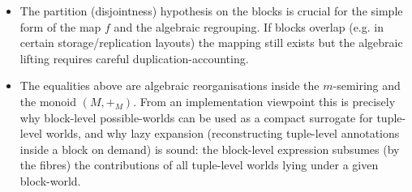 \begin{remark}

\begin{itemize}
  \item The partition (disjointness) hypothesis on the blocks is crucial for the simple form of the map $f$ and the algebraic regrouping. If blocks overlap (e.g. in certain storage/replication layouts) the mapping still exists but the algebraic lifting requires careful duplication-accounting.
  \item The equalities above are algebraic reorganisations inside the $m$-semiring and the monoid $(M,+_M)$. From an implementation viewpoint this is precisely why block-level possible-worlds can be used as a compact surrogate for tuple-level worlds, and why lazy expansion (reconstructing tuple-level annotations inside a block on demand) is sound: the block-level expression subsumes (by the fibres) the contributions of all tuple-level worlds lying under a given block-world.
\end{itemize}
\end{remark}